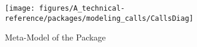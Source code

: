 %
%

\begin{figure}[htb]
  \centering
  \texttt{[image: figures/A\_technical-reference/packages/modeling\_calls/CallsDiag]}
  \caption{Meta-Model of the  Package}
  \label{fig:MM:calls}
\end{figure}
